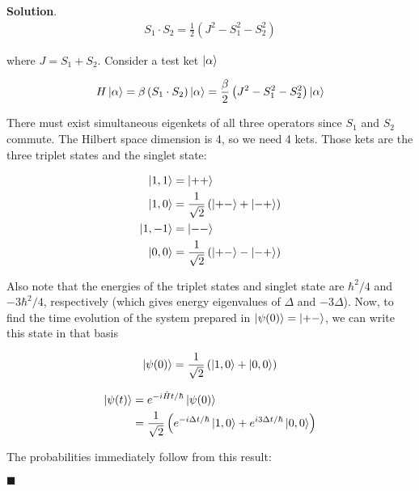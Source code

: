 \documentclass[12pt]{article}
\theoremstyle{definition}
\newenvironment{s}{%
        \begin{trivlist} \item \textbf{Solution}. }{%
            \hspace*{\fill} $\blacksquare$\end{trivlist}}%
\begin{document}
{\begin{s}
\begin{align*}
S_{1}\cdot S_{2} = \frac{1}{2}\left(J^{2} - S_{1}^{2} - S_{2}^{2}\right)
\end{align*}

where $J = S_{1} + S_{2}$. Consider a test ket $\ket{\alpha}$

\begin{align*}
H\ket{\alpha} = \beta\left(S_{1}\cdot S_{2}\right)\ket{\alpha} = \frac{\beta}{2}\left(J^{2} - S_{1}^{2} - S_{2}^{2}\right)\ket{\alpha}
\end{align*}

There must exist simultaneous eigenkets of all three operators since $S_{1}$ and $S_{2}$ commute. The Hilbert space dimension is 4, so we need 4 kets. Those kets are the three triplet states and the singlet state:

\begin{align*}
\ket{1,1} &= \ket{++}\\ 
\ket{1,0} &= \frac{1}{\sqrt{2}}\left(\ket{+-} + \ket{-+}\right)\\
\ket{1,-1} &= \ket{--}\\
\ket{0,0} &= \frac{1}{\sqrt{2}}\left(\ket{+-} - \ket{-+}\right)\\ 
\end{align*}

Also note that the energies of the triplet states and singlet state are $\hbar^{2}/4$ and $-3\hbar^{2}/4$, respectively (which gives energy eigenvalues of $\Delta$ and $-3\Delta$). Now, to find the time evolution of the system prepared in $\ket{\psi(0)} = \ket{+-}$, we can write this state in that basis

\begin{align*}
\ket{\psi(0)} = \frac{1}{\sqrt{2}}\left(\ket{1,0} + \ket{0,0}\right)
\end{align*}

\begin{align*}
\ket{\psi(t)} &= e^{-i\hat{H}t/\hbar}\ket{\psi(0)}\\
&= \frac{1}{\sqrt{2}}\left(e^{-i\Delta t/\hbar}\ket{1,0} + e^{i3\Delta t/\hbar}\ket{0,0}\right)
\end{align*}

The probabilities immediately follow from this result:

\end{s}
\end{document}
